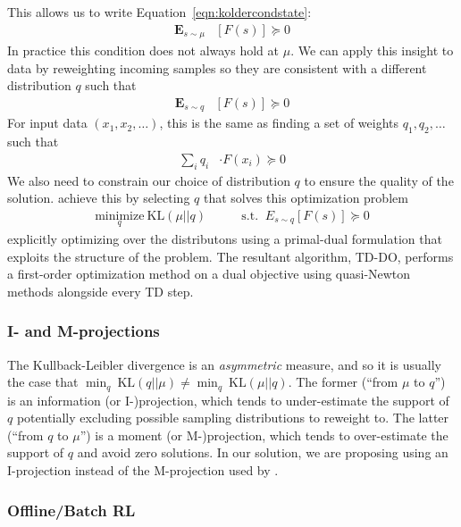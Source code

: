\documentclass[11pt]{article}
\newcommand{\E}{\textbf{E}}
\begin{document}
This allows us to write Equation~\ref{eqn:koldercondstate}:
\begin{align}
\E_{s\sim \mu} & [F(s)] \succcurlyeq 0
\end{align}
In practice this condition does not always hold at $\mu$. We can apply this insight to data by reweighting incoming samples so they are consistent with a different distribution $q$ such that
\begin{align}
\E_{s\sim q} & [F(s)] \succcurlyeq 0
\end{align}
For input data $(x_1, x_2, \ldots)$, this is the same as finding a set of weights $q_1, q_2, \ldots$ such that
\begin{align}
\sum_i q_i & \cdot F(x_i) \succcurlyeq 0
\end{align}
We also need to constrain our choice of distribution $q$ to ensure the quality of the solution. \citet{kolter2011fixed} achieve this by selecting $q$ that solves this optimization problem
\begin{align}
    \underset{q}{\text{minimize}}~\text{KL}(\mu||q) & \qquad \text{s.t. } ~ E_{s\sim q}[F(s)] \succcurlyeq 0 \label{eqn:kolter2011objective}
\end{align}
explicitly optimizing over the distributons using a primal-dual formulation that exploits the structure of the problem. The resultant algorithm, TD-DO, performs a first-order optimization method on a dual objective using quasi-Newton methods alongside every TD step.


\subsubsection{I- and M-projections} \label{sec:improj}
The Kullback-Leibler divergence is an \emph{asymmetric} measure, and so it is usually the case that $\min_q~\text{KL}(q||\mu) \neq \min_q~\text{KL}(\mu||q)$. The former (``from $\mu$ to $q$'') is an information (or I-)projection, which tends to under-estimate the support of $q$ potentially excluding possible sampling distributions to reweight to. The latter (``from $q$ to $\mu$'') is a moment (or M-)projection, which tends to over-estimate the support of $q$ and avoid zero solutions. In our solution, we are proposing using an I-projection instead of the M-projection used by \citet{kolter2011fixed}. 

\subsubsection{Offline/Batch RL}
\end{document}
